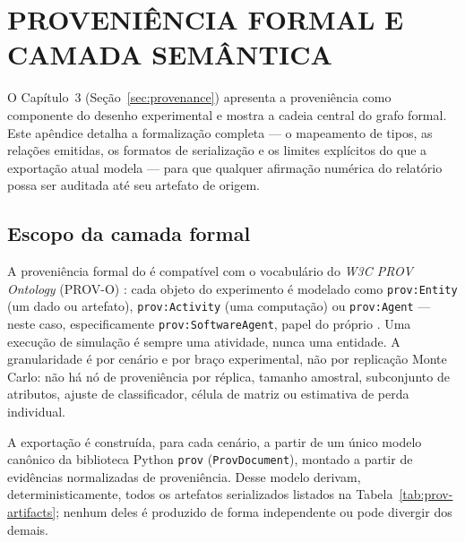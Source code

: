 \chapter{PROVENIÊNCIA FORMAL E CAMADA SEMÂNTICA}
\label{ap:proveniencia}

O Capítulo~3 (Seção~\ref{sec:provenance}) apresenta a proveniência como componente do desenho experimental e mostra a cadeia central do grafo formal. Este apêndice detalha a formalização completa --- o mapeamento de tipos, as relações emitidas, os formatos de serialização e os limites explícitos do que a exportação atual modela --- para que qualquer afirmação numérica do relatório possa ser auditada até seu artefato de origem.

\section{Escopo da camada formal}

A proveniência formal do \CoInfoSim{} é compatível com o vocabulário do \emph{W3C PROV Ontology} (PROV-O) \cite{provo2013}: cada objeto do experimento é modelado como \texttt{prov:Entity} (um dado ou artefato), \texttt{prov:Activity} (uma computação) ou \texttt{prov:Agent} --- neste caso, especificamente \texttt{prov:SoftwareAgent}, papel do próprio \CoInfoSim{}. Uma execução de simulação é sempre uma atividade, nunca uma entidade. A granularidade é por cenário e por braço experimental, não por replicação Monte Carlo: não há nó de proveniência por réplica, tamanho amostral, subconjunto de atributos, ajuste de classificador, célula de matriz ou estimativa de perda individual.

A exportação é construída, para cada cenário, a partir de um único modelo canônico da biblioteca Python \texttt{prov} (\texttt{ProvDocument}), montado a partir de evidências normalizadas de proveniência. Desse modelo derivam, deterministicamente, todos os artefatos serializados listados na Tabela~\ref{tab:prov-artifacts}; nenhum deles é produzido de forma independente ou pode divergir dos demais.

